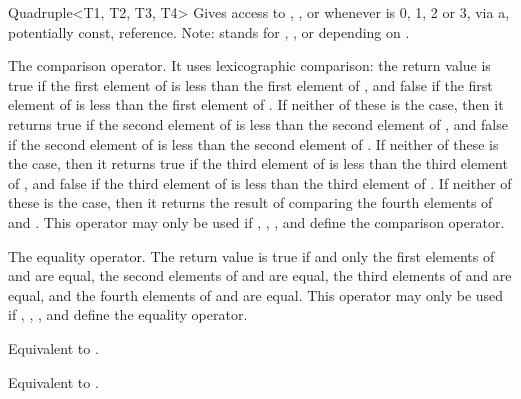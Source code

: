 \begin{ccRefClass}{Quadruple<T1, T2, T3, T4>}
    {Gives access to , ,  or 
     whenever  is 0, 1, 2 or 3, via a, potentially const, reference.
     Note:  stands for , ,  or 
     depending on .}
   
   {The comparison operator. It uses lexicographic comparison:
    the return value is true if the first element of  is less
    than the first element of , and false if the first element
    of  is less than the first element of . If neither
    of these is the case, then it returns true if the second element
    of  is less than the second element of , and false
    if the second element of  is less than the second element
    of . If neither of these is the case, then it returns true
    if the third element of  is less than the third element of
    , and false if the third element of  is less than
    the third element of .  If neither of these is the case,
    then it returns the result of comparing the fourth elements of
     and . This operator may only be used if ,
    , , and  define the comparison operator.}
  
   {The equality operator. The return value is true if and only
    the first elements of  and  are equal, the second
    elements of  and  are equal, the third elements of
     and  are equal, and the fourth elements of 
    and  are equal.  This operator may only be used if
    , , , and  define the equality
    operator.}
  
  {Equivalent to .}
  
  {Equivalent to .}

\end{ccRefClass}

